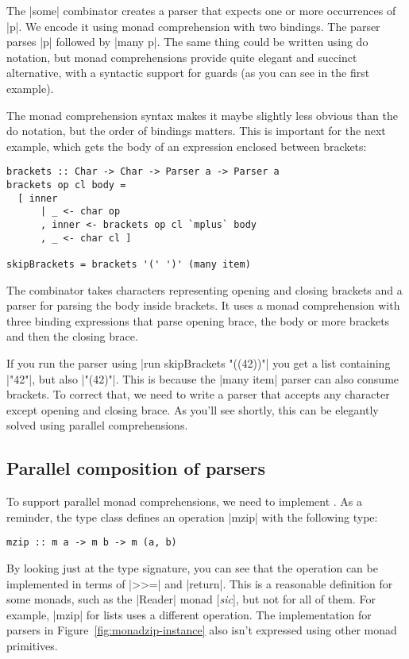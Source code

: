 \documentclass{tmr}
\begin{document}
The |some| combinator creates a parser that expects one or more occurrences of |p|. We encode it
using monad comprehension with two bindings. The parser parses |p| followed by |many p|. The same 
thing could be written using do notation, but monad comprehensions provide quite elegant and 
succinct alternative, with a syntactic support for guards (as you can see in the first example).

The monad comprehension syntax makes it maybe slightly less obvious than the do notation, but the 
order of bindings matters. This is important for the next example, which gets the body of 
an expression enclosed between brackets:

\begin{verbatim}
brackets :: Char -> Char -> Parser a -> Parser a
brackets op cl body = 
  [ inner 
      | _ <- char op
      , inner <- brackets op cl `mplus` body
      , _ <- char cl ]

skipBrackets = brackets '(' ')' (many item)
\end{verbatim}
The combinator takes characters representing opening and closing brackets and a parser for parsing 
the body inside brackets. It uses a monad comprehension with three binding expressions that parse
opening brace, the body or more brackets and then the closing brace.

If you run the parser using |run skipBrackets "((42))"| you get a list containing |"42"|, but also 
|"(42)"|. This is because the |many item| parser can also consume brackets. To correct that, we need
to write a parser that accepts any character except opening and closing brace. As you'll see 
shortly, this can be elegantly solved using parallel comprehensions.


\subsection{Parallel composition of parsers}
To support parallel monad comprehensions, we need to implement . 
As a reminder, the type class defines an operation |mzip| with the following type:

\begin{verbatim}
mzip :: m a -> m b -> m (a, b)
\end{verbatim}
By looking just at the type signature, you can see that the operation can be implemented in terms
of |>>=| and |return|. This is a reasonable definition for some monads, such as the |Reader| monad 
[\textit{sic}], but not for all of them. For example, |mzip| for lists uses a different operation. 
The implementation for parsers in Figure~\ref{fig:monadzip-instance} also isn't expressed using
other monad primitives.
\end{document}
